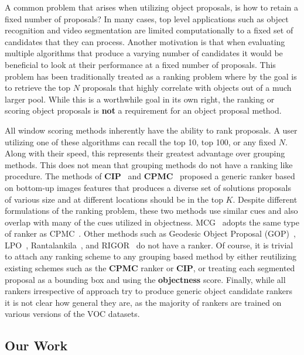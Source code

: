 A common problem that arises when utilizing object proposals, is how to retain a fixed number of proposals? In many cases, top level applications such as object recognition and video segmentation are limited computationally to a fixed set of candidates that they can process. Another motivation is that when evaluating multiple algorithms that produce a varying number of candidates it would be beneficial to look at their performance at a fixed number of proposals. This problem has been traditionally treated as a ranking problem where by the goal is to retrieve the top $N$ proposals that highly correlate with objects out of a much larger pool. While this is a worthwhile goal in its own right, the ranking or scoring object proposals is {\bf not} a requirement for an object proposal method.

All window scoring methods inherently have the ability to rank proposals. A user utilizing one of these algorithms can recall the top 10, top 100, or any fixed $N$. Along with their speed, this represents their greatest advantage over grouping methods. This does not mean that grouping methods do not have a ranking like procedure. The methods of {\bf CIP}~\cite{Endres:Hoiem:PAMI14} and {\bf CPMC}~\cite{Carreira:Sminchisescu:PAMI12} proposed a generic ranker based on bottom-up images features that produces a diverse set of solutions \ie proposals of various size and at different locations should be in the top $K$. Despite different formulations of the ranking problem, these two methods use similar cues and also overlap with many of the cues utilized in objectness. MCG~\cite{Arbelaez:etal:CVPR14} adopts the same type of ranker as CPMC~\cite{Carreira:Sminchisescu:PAMI12}. Other methods such as Geodesic Object Proposal (GOP)~\cite{Krahenbuhl:Koltun:ECCV14}, LPO~\cite{Krahenbuhl:Koltun:CVPR15}, Rantalankila~\cite{Rantalankila:etal:CVPR14}, and RIGOR~\cite{Humayun:etal:CVPR14} do not have a ranker. Of course, it is trivial to attach any ranking scheme to any grouping based method by either reutilizing existing schemes such as the {\bf CPMC} ranker or {\bf CIP}, or treating each segmented proposal as a bounding box and using the {\bf objectness} score. Finally, while all rankers irrespective of approach try to produce generic object candidate rankers it is not clear how general they are, as the majority of rankers are trained on various versions of the VOC datasets.

\subsection{Our Work}

